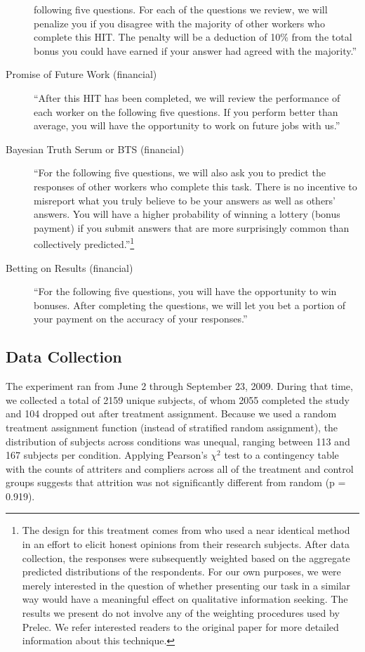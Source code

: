\documentclass{chi2009}
\begin{document}
\begin{description}
  following five questions. For each of the questions we review, we
  will penalize you if you disagree with the majority of other workers
  who complete this HIT. The penalty will be a deduction of 10\% from
  the total bonus you could have earned if your answer had agreed with
  the majority.'' %
\item[Promise of Future Work (financial)] ``After this HIT has been
  completed, we will review the performance of each worker on the
  following five questions. If you perform better than average, you
  will have the opportunity to work on future jobs with us.'' %
\item[Bayesian Truth Serum or BTS (financial)] ``For the following
  five questions, we will also ask you to predict the responses of
  other workers who complete this task. There is no incentive to
  misreport what you truly believe to be your answers as well as
  others' answers. You will have a higher probability of winning a
  lottery (bonus payment) if you submit answers that are more
  surprisingly common than collectively predicted.''\footnote{The
    design for this treatment comes from \cite{prelec_bts_2004} who
    used a near identical method in an effort to elicit honest
    opinions from their research subjects. After data collection, the
    responses were subsequently weighted based on the aggregate
    predicted distributions of the respondents. For our own purposes,
    we were merely interested in the question of whether presenting
    our task in a similar way would have a meaningful effect on
    qualitative information seeking. The results we present do not
    involve any of the weighting procedures used by Prelec. We refer
    interested readers to the original paper for more detailed
    information about this technique.}
\item[Betting on Results (financial)] ``For the following five
  questions, you will have the opportunity to win bonuses. After
  completing the questions, we will let you bet a portion of your
  payment on the accuracy of your responses.'' %
\end{description} 

\subsection{Data Collection}
The experiment ran from June 2 through September 23, 2009. During that
time, we collected a total of 2159 unique subjects, of whom 2055
completed the study and 104 dropped out after treatment
assignment. Because we used a random treatment assignment function
(instead of stratified random assignment), the distribution of
subjects across conditions was unequal, ranging between 113 and 167
subjects per condition. Applying Pearson's $\chi^{2}$ test to a
contingency table with the counts of attriters and compliers across
all of the treatment and control groups suggests that attrition was
not significantly different from random (p = 0.919).
\end{document}
